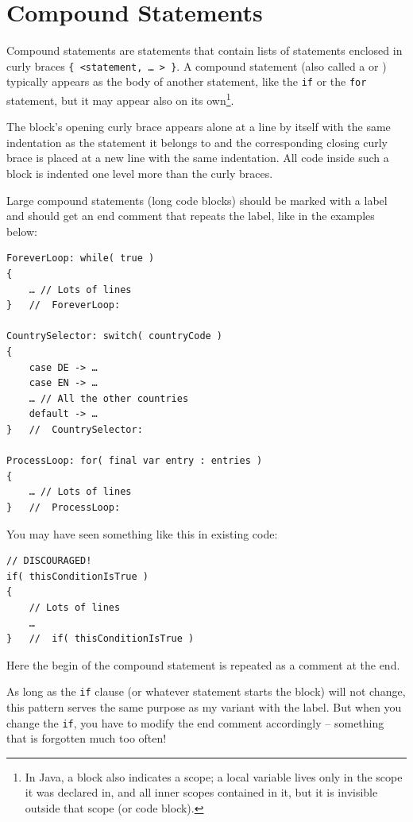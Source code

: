 \section{Compound Statements}\label{sec:CompoundStatements}
Compound statements are statements that contain lists of statements enclosed in curly braces \lstinline|{ <statement, … > }|. A compound statement (also called a  or ) typically appears as the body of another statement, like the \lstinline|if| or the \lstinline|for| statement, but it may appear also on its own\footnote{In Java, a block also indicates a scope; a local variable lives only in the scope it was declared in, and all inner scopes contained in it, but it is invisible outside that scope (or code block).}.

The block's opening curly brace \bdq{\{} appears alone at a line by itself with the same indentation as the statement it belongs to and the corresponding closing curly brace \bdq{\}} is placed at a new line with the same indentation. All code inside such a block is indented one level more than the curly braces.

Large compound statements (long code blocks) should be marked with a label and should get an end comment that repeats the label, like in the examples below: 
\begin{lstlisting}
ForeverLoop: while( true )
{
    … // Lots of lines
}   //  ForeverLoop:

CountrySelector: switch( countryCode )
{
    case DE -> …
    case EN -> …
    … // All the other countries
    default -> …
}   //  CountrySelector:

ProcessLoop: for( final var entry : entries )
{
    … // Lots of lines
}   //  ProcessLoop:
\end{lstlisting}

You may have seen something like this in existing code:
\begin{lstlisting}
// DISCOURAGED!
if( thisConditionIsTrue )
{
    // Lots of lines
    …
}   //	if( thisConditionIsTrue ) 
\end{lstlisting}
Here the begin of the compound statement is repeated as a comment at the end.

As long as the \lstinline|if| clause (or whatever statement starts the block) will not change, this pattern serves the same purpose as my variant with the label. But when you change the \lstinline|if|, you have to modify the end comment accordingly – something that is forgotten much too often!

